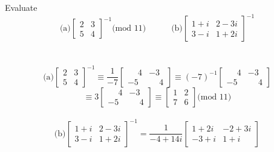 \documentclass[titlepage]{article}
\newenvironment{problem}[2][Problem]{\begin{trivlist}
\item[\hskip \labelsep {\bfseries #1}\hskip \labelsep {\bfseries #2.}]}{\end{trivlist}}
\begin{document}
\begin{problem}{6} 
Evaluate
$$\text{(a)} \begin{bmatrix}2 & 3 \\ 5 & 4\end{bmatrix}^{-1}\text{(mod 11)} \quad \quad \quad \text{(b)} \begin{bmatrix} 	1+i & 2-3i \\ 3 - i & 1 +2i \end{bmatrix}^{-1} $$
\\ \\
$$ \text{(a)}\begin{bmatrix}2 & 3 \\ 5 & 4\end{bmatrix}^{-1} \equiv \frac{1}{-7} \begin{bmatrix}\phantom{-}4 & -3 \\ -5 & \phantom{-}4 \end{bmatrix} \equiv (-7)^{-1} \begin{bmatrix}\phantom{-}4 & -3 \\ -5 & \phantom{-}4 \end{bmatrix}
$$ $$ \equiv 3  \begin{bmatrix}\phantom{-}4 & -3 \\ -5 & \phantom{-}4 \end{bmatrix} \equiv \begin{bmatrix}1 & 2 \\ 7 & 6 \end{bmatrix}\text{(mod 11)} $$
\\
$$\text{(b)} \begin{bmatrix} 1+i & 2-3i \\ 3 - i & 1 + 2i \end{bmatrix} ^{-1} = \frac{1}{-4+14i}\begin{bmatrix}1 +2i & -2 + 3i \\ -3 + i & 1 + i \end{bmatrix}$$
\end{problem}
\end{document}
